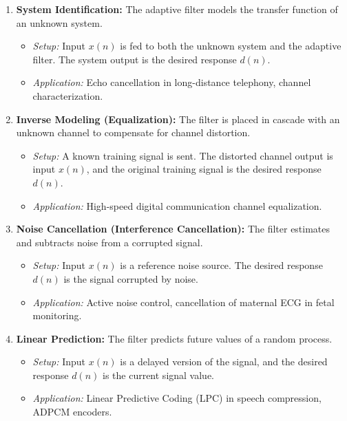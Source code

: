 \documentclass[12pt,a4paper]{article}
\begin{document}
\begin{enumerate}[label=\textbf{\arabic*.}, leftmargin=*, itemsep=4pt]
  \item \textbf{System Identification:} The adaptive filter models the transfer function of an unknown system.
    \begin{itemize}[label=$\bullet$, leftmargin=*]
      \item \textit{Setup:} Input $x(n)$ is fed to both the unknown system and the adaptive filter. The system output is the desired response $d(n)$.
      \item \textit{Application:} Echo cancellation in long-distance telephony, channel characterization.
    \end{itemize}
  \item \textbf{Inverse Modeling (Equalization):} The filter is placed in cascade with an unknown channel to compensate for channel distortion.
    \begin{itemize}[label=$\bullet$, leftmargin=*]
      \item \textit{Setup:} A known training signal is sent. The distorted channel output is input $x(n)$, and the original training signal is the desired response $d(n)$.
      \item \textit{Application:} High-speed digital communication channel equalization.
    \end{itemize}
  \item \textbf{Noise Cancellation (Interference Cancellation):} The filter estimates and subtracts noise from a corrupted signal.
    \begin{itemize}[label=$\bullet$, leftmargin=*]
      \item \textit{Setup:} Input $x(n)$ is a reference noise source. The desired response $d(n)$ is the signal corrupted by noise.
      \item \textit{Application:} Active noise control, cancellation of maternal ECG in fetal monitoring.
    \end{itemize}
  \item \textbf{Linear Prediction:} The filter predicts future values of a random process.
    \begin{itemize}[label=$\bullet$, leftmargin=*]
      \item \textit{Setup:} Input $x(n)$ is a delayed version of the signal, and the desired response $d(n)$ is the current signal value.
      \item \textit{Application:} Linear Predictive Coding (LPC) in speech compression, ADPCM encoders.
    \end{itemize}
\end{enumerate}
\end{document}
